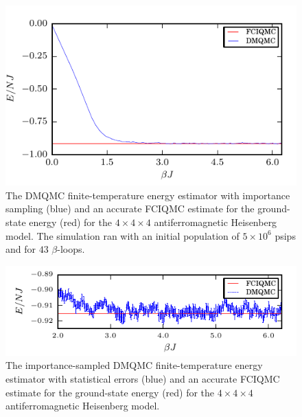\begin{figure}[H]
\begin{center}
\includegraphics[width =1\textwidth]{4x4x4_is_energy.pdf}
\caption[The DMQMC finite-temperature energy estimator with importance sampling for the $4\times4\times4$ antiferromagnetic Heisenberg model.]{The DMQMC finite-temperature energy estimator with importance sampling (blue) and an accurate FCIQMC estimate for the ground-state energy (red) for the $4\times4\times4$ antiferromagnetic Heisenberg model.  The simulation ran with an initial population of $5\times10^6$ psips and for $43$ $\beta$-loops.}
\label{fig:4x4x4_is_energy}
\end{center}
\end{figure}
\begin{figure}[H]
\begin{center}
\includegraphics[width =1\textwidth]{4x4x4_is_energy_subplot.pdf}
\caption[The importance-sampled DMQMC finite-temperature energy estimator with statistical errors for the  $4\times4\times4$ antiferromagnetic Heisenberg model.]{The importance-sampled DMQMC finite-temperature energy estimator with statistical errors (blue) and an accurate FCIQMC estimate for the ground-state energy (red) for the $4\times4\times4$ antiferromagnetic Heisenberg model.}
\label{fig:4x4x4_is_energy_subplot}
\end{center}
\end{figure}

